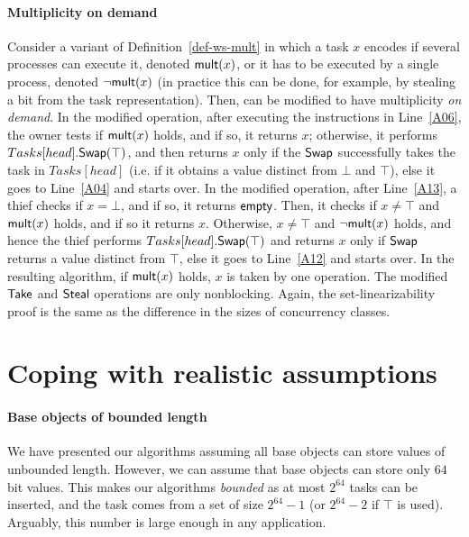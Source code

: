 \paragraph*{Multiplicity on demand}

Consider a variant of Definition~\ref{def-ws-mult} in which a task \(x\) encodes if several processes can execute it, denoted \({\sf mult}(x)\), or it has to be executed by a single process, denoted \({\sf \neg mult}(x)\) (in practice this can be done, for example, by stealing a bit from the task representation). Then, \WFWSM can be modified to have multiplicity \emph{on demand}. In the modified \Take operation, after executing the instructions in Line~\ref{A06}, the owner tests if \({\sf mult}(x)\) holds, and if so, it returns \(x\); otherwise, it performs \(Tasks[head].{\sf Swap}(\top)\), and then returns \(x\) only if the \({\sf Swap}\) successfully takes the task in \(Tasks[head]\) (i.e. if it obtains a value distinct from $\bot$ and $\top$), else it goes to Line~\ref{A04} and starts over. In the modified \Steal operation, after Line~\ref{A13}, a thief checks if \(x = \bot\), and if so, it returns \({\sf empty}\). Then, it checks if \(x \neq \top\) and \({\sf mult}(x)\) holds, and if so it returns \(x\).  Otherwise, \(x \neq \top\) and \({\sf \neg mult}(x)\) holds, and hence the thief performs \(Tasks[head].{\sf Swap}(\top)\) and returns \(x\) only if \({\sf Swap}\) returns a value distinct from \(\top\), else it goes to Line~\ref{A12} and starts over.  In the resulting algorithm, if \({\sf mult}(x)\) holds, \(x\) is taken by one operation.  The modified ${\sf Take}$ and ${\sf Steal}$ operations are only nonblocking.  Again, the set-linearizability proof is the same as the difference in the sizes of concurrency classes.

\section{\label{sec-removing-infinite-arrays}Coping with realistic assumptions}

\paragraph*{Base objects of bounded length}
We have presented our algorithms assuming all base objects can store values of unbounded length.  However, we can assume that base objects can store only \(64\) bit values. This makes our algorithms \emph{bounded} as at most \(2^{64}\) tasks can be inserted, and the task comes from a set of size \(2^{64} - 1\) (or \(2^{64} - 2\) if \(\top\) is used).  Arguably, this number is large enough in any application.


